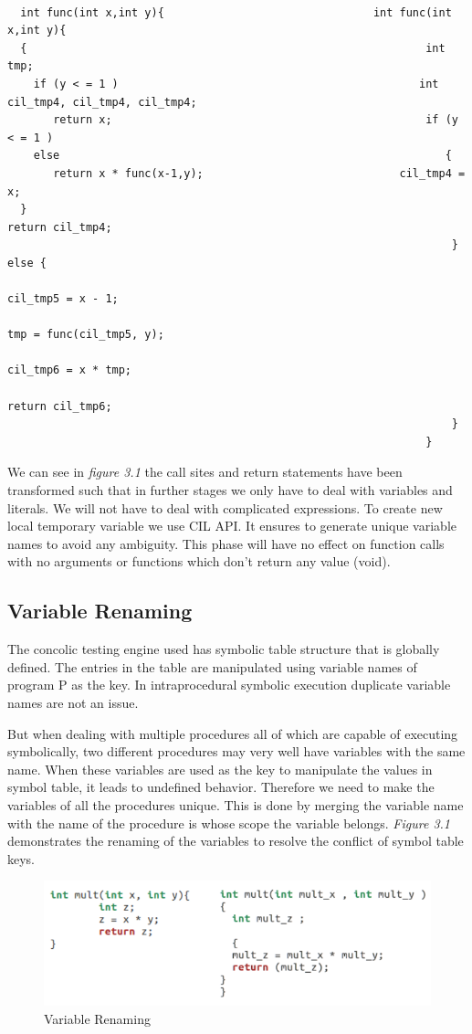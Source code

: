 \documentclass[12pt,oneside]{book}
\begin{document}
\begin{lstlisting}[caption=Expressions simplified]

  int func(int x,int y){								int func(int x,int y){
  {																int tmp;
    if (y < = 1 )											   int cil_tmp4, cil_tmp4, cil_tmp4;
       return x;												if (y < = 1 )
    else														   {
       return x * func(x-1,y);							    cil_tmp4 = x;
  }																    return cil_tmp4;
     															    } else {
																       cil_tmp5 = x - 1;
																       tmp = func(cil_tmp5, y);
																       cil_tmp6 = x * tmp;
																       return cil_tmp6;
																    }
															    }

\end{lstlisting}


We can see in \textit{figure 3.1} the call sites and return statements have been transformed such that in further stages we only have to deal with variables and literals. We will not have to deal with complicated expressions. To create new local temporary variable we use CIL API. It ensures to generate unique variable names to avoid any ambiguity.
This phase will have no effect on function calls with no arguments or functions which don't return any value (void).
\newpage

\subsection{Variable Renaming}
The concolic testing engine used has symbolic table structure that is globally defined. The entries in the table are manipulated using variable names of program P as the key. In intraprocedural symbolic execution duplicate variable names are not an issue.

But when dealing with multiple procedures all of which are capable of executing symbolically, two different procedures may very well have variables with the same name. When these variables are used as the key to manipulate the values in symbol table, it leads to undefined behavior. Therefore we need to make the variables of all the procedures unique. This is done by merging the variable name with the name of the procedure is whose scope the variable belongs. \textit{Figure 3.1} demonstrates the renaming of the variables to resolve the conflict of symbol table keys. \\

\begin{figure}[htbp]
\centering
\includegraphics[scale=0.45]{renamed1.png}
\caption{Variable Renaming}
\end{figure}  
\end{document}
